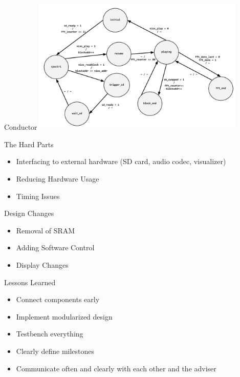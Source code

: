\documentclass{beamer}
\begin{document}
\begin{frame}{Conductor}
	\centering
    \includegraphics[width=4in]{conductor_state}
\end{frame}

\begin{frame}{The Hard Parts}
	\begin{itemize}
		\item Interfacing to external hardware (SD card, audio codec, visualizer) 
		\item Reducing Hardware Usage
		\item Timing Issues
	\end{itemize}
\end{frame}

\begin{frame}{Design Changes}
	\begin{itemize}
		\item Removal of SRAM
		\item Adding Software Control
		\item Display Changes
	\end{itemize}
\end{frame}

\begin{frame}{Lessons Learned}
	\begin{itemize}
		\item Connect components early
		\item Implement modularized design
		\item Testbench everything
		\item Clearly define milestones
		\item Communicate often and clearly with each other and the adviser
	\end{itemize}
\end{frame}
\end{document}
